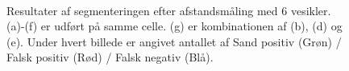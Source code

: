 \begin{figure}[H]
  \hspace{0.1cm}
  \hspace{0.1cm}
  \\
  \caption{Resultater af segmenteringen efter afstandsmåling med 6 vesikler. (a)-(f) er udført på samme celle. (g) er kombinationen af (b), (d) og (e). Under hvert billede er angivet antallet af Sand positiv (Grøn) / Falsk positiv (Rød) / Falsk negativ (Blå).}
  \label{fig:animalsss}
\end{figure}


